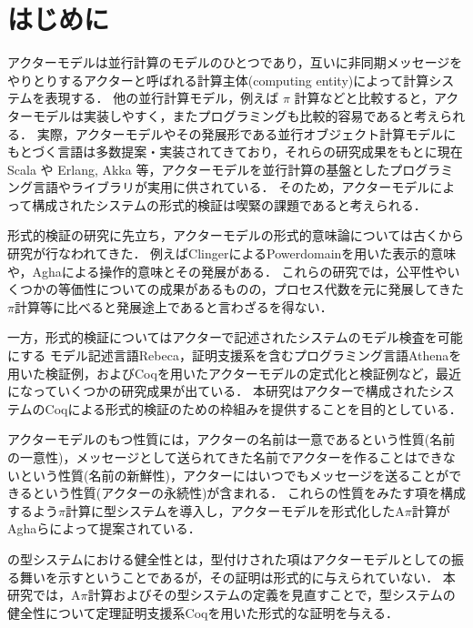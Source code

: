 \section{はじめに}

アクターモデル\cite{Agha:1986aa}は並行計算のモデルのひとつであり，互いに非同期メッセージをやりとりするアクターと呼ばれる計算主体(computing entity)によって計算システムを表現する．
他の並行計算モデル，例えば $\pi$ 計算などと比較すると，アクターモデルは実装しやすく，またプログラミングも比較的容易であると考えられる．
実際，アクターモデルやその発展形である並行オブジェクト計算モデル\cite{Yonezawa:1986aa}にもとづく言語は多数提案・実装されてきており，それらの研究成果をもとに現在 Scala や Erlang, Akka 等，アクターモデルを並行計算の基盤としたプログラミング言語やライブラリが実用に供されている．
そのため，アクターモデルによって構成されたシステムの形式的検証は喫緊の課題であると考えられる．

形式的検証の研究に先立ち，アクターモデルの形式的意味論については古くから研究が行なわれてきた．
例えばClingerによるPowerdomainを用いた表示的意味\cite{Clinger:1981aa}や，Aghaによる操作的意味\cite{Agha:1986aa}とその発展\cite{Agha:1997aa}がある．
これらの研究では，公平性やいくつかの等価性についての成果があるものの，プロセス代数を元に発展してきた$\pi$計算等に比べると発展途上であると言わざるを得ない．

一方，形式的検証についてはアクターで記述されたシステムのモデル検査を可能にする
モデル記述言語Rebeca\cite{Sirjani:2011aa}，証明支援系を含むプログラミング言語Athenaを用いた検証例\cite{Musser:2013aa}，およびCoqを用いたアクターモデルの定式化と検証例\cite{Garnock-Jones:2014aa}など，最近になっていくつかの研究成果が出ている．
本研究はアクターで構成されたシステムのCoqによる形式的検証のための枠組みを提供することを目的としている．

アクターモデルのもつ性質には，アクターの名前は一意であるという性質(名前の一意性)，メッセージとして送られてきた名前でアクターを作ることはできないという性質(名前の新鮮性)，アクターにはいつでもメッセージを送ることができるという性質(アクターの永続性)が含まれる．
これらの性質をみたす項を構成するよう\(\pi\)計算に型システムを導入し，アクターモデルを形式化したA\(\pi\)計算がAghaらによって提案されている\cite{Agha:2004aa}．

\api の型システムにおける健全性とは，型付けされた項はアクターモデルとしての振る舞いを示すということであるが，その証明は形式的に与えられていない．
本研究では，A\(\pi\)計算およびその型システムの定義を見直すことで，型システムの健全性について定理証明支援系Coqを用いた形式的な証明を与える．


